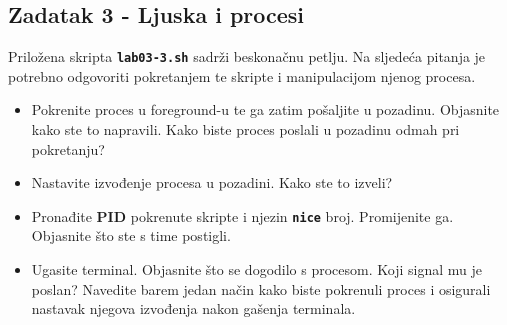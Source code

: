 \documentclass[12pt,a4paper]{article}
\newcommand{\shell}[1]{\texttt{\textbf{#1}}}
\begin{document}
\pagebreak
\subsection*{Zadatak 3 - Ljuska i procesi}
  Priložena skripta \shell{lab03-3.sh} sadrži beskonačnu petlju. Na sljedeća pitanja je potrebno odgovoriti pokretanjem te skripte i manipulacijom njenog procesa.
	\begin{itemize}
    \item Pokrenite proces u foreground-u te ga zatim pošaljite u pozadinu. Objasnite kako ste to napravili. Kako biste proces poslali u pozadinu odmah pri pokretanju?
    \item Nastavite izvođenje procesa u pozadini. Kako ste to izveli?
    \item Pronađite \textbf{PID} pokrenute skripte i njezin \shell{nice} broj. Promijenite ga. Objasnite što ste s time postigli.
    \item Ugasite terminal. Objasnite što se dogodilo s procesom. Koji signal mu je poslan? Navedite barem jedan način kako biste pokrenuli proces i osigurali nastavak njegova izvođenja nakon gašenja terminala.
	\end{itemize}
\end{document}
